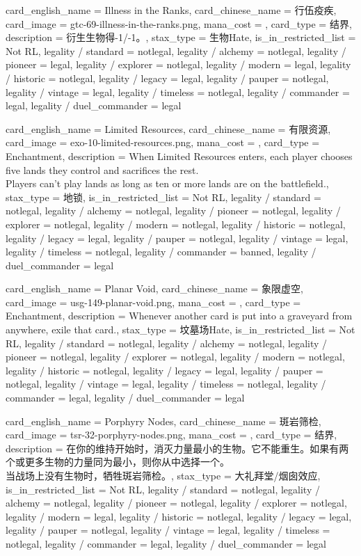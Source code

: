 \documentclass[lang = cn, color = black, 10pt]{AllThatStax}
\begin{document}
\card
{
	card_english_name = {Illness in the Ranks},
	card_chinese_name = {行伍疫疾},
	card_image = gtc-69-illness-in-the-ranks.png,
	mana_cost = ,
	card_type = 结界,
	description = {衍生生物得-1/-1。},
	stax_type = 生物Hate,
	is_in_restricted_list = Not RL,
	legality / standard = notlegal,
	legality / alchemy = notlegal,
	legality / pioneer = legal,
	legality / explorer = notlegal,
	legality / modern = legal,
	legality / historic = notlegal,
	legality / legacy = legal,
	legality / pauper = notlegal,
	legality / vintage = legal,
	legality / timeless = notlegal,
	legality / commander = legal,
	legality / duel_commander = legal
}

\card
{
	card_english_name = {Limited Resources},
	card_chinese_name = {有限资源},
	card_image = exo-10-limited-resources.png,
	mana_cost = ,
	card_type = Enchantment,
	description = {When Limited Resources enters, each player chooses five lands they control and sacrifices the rest.\\
		Players can't play lands as long as ten or more lands are on the battlefield.},
	stax_type = 地锁,
	is_in_restricted_list = Not RL,
	legality / standard = notlegal,
	legality / alchemy = notlegal,
	legality / pioneer = notlegal,
	legality / explorer = notlegal,
	legality / modern = notlegal,
	legality / historic = notlegal,
	legality / legacy = legal,
	legality / pauper = notlegal,
	legality / vintage = legal,
	legality / timeless = notlegal,
	legality / commander = banned,
	legality / duel_commander = legal
}

\card
{
	card_english_name = {Planar Void},
	card_chinese_name = {象限虚空},
	card_image = usg-149-planar-void.png,
	mana_cost = ,
	card_type = Enchantment,
	description = {Whenever another card is put into a graveyard from anywhere, exile that card.},
	stax_type = 坟墓场Hate,
	is_in_restricted_list = Not RL,
	legality / standard = notlegal,
	legality / alchemy = notlegal,
	legality / pioneer = notlegal,
	legality / explorer = notlegal,
	legality / modern = notlegal,
	legality / historic = notlegal,
	legality / legacy = legal,
	legality / pauper = notlegal,
	legality / vintage = legal,
	legality / timeless = notlegal,
	legality / commander = legal,
	legality / duel_commander = legal
}

\card
{
	card_english_name = {Porphyry Nodes},
	card_chinese_name = {斑岩筛检},
	card_image = tsr-32-porphyry-nodes.png,
	mana_cost = ,
	card_type = 结界,
	description = {在你的维持开始时，消灭力量最小的生物。它不能重生。如果有两个或更多生物的力量同为最小，则你从中选择一个。\\
		当战场上没有生物时，牺牲斑岩筛检。},
	stax_type = 大礼拜堂/烟囱效应,
	is_in_restricted_list = Not RL,
	legality / standard = notlegal,
	legality / alchemy = notlegal,
	legality / pioneer = notlegal,
	legality / explorer = notlegal,
	legality / modern = legal,
	legality / historic = notlegal,
	legality / legacy = legal,
	legality / pauper = notlegal,
	legality / vintage = legal,
	legality / timeless = notlegal,
	legality / commander = legal,
	legality / duel_commander = legal
}
\end{document}
